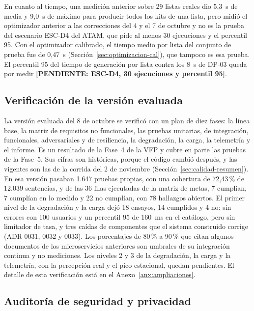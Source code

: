 En cuanto al tiempo, una medición anterior sobre 29 listas reales dio 5,3~s de media y 9,0~s de
máximo para producir todos los kits de una lista, pero midió el optimizador anterior a las
correcciones del 4 y el 7 de octubre y no es la prueba del escenario ESC-D4 del ATAM, que pide al
menos 30 ejecuciones y el percentil 95. Con el optimizador calibrado, el tiempo medio por lista del
conjunto de prueba fue de 0,47~s (Sección~\ref{sec:optimizacion-cal}), que tampoco es esa prueba.
El percentil 95 del tiempo de generación por lista contra los 8~s de DP-03 queda por medir
\textbf{[PENDIENTE: ESC-D4, 30 ejecuciones y percentil 95]}.

\subsection{Verificación de la versión evaluada}
\label{sec:calidad}

La versión evaluada del 8 de octubre se verificó con un plan de diez fases: la línea base, la
matriz de requisitos no funcionales, las pruebas unitarias, de integración, funcionales,
adversariales y de resiliencia, la degradación, la carga, la telemetría y el informe. Es un
resultado de la Fase~4 de la VFP y cubre en parte las pruebas de la Fase~5. Sus cifras son
históricas, porque el código cambió después, y las vigentes son las de la corrida del 2 de
noviembre (Sección~\ref{sec:calidad-resumen}). En esa versión pasaban 1.647 pruebas propias, con
una cobertura de 72,43\,\% de 12.039 sentencias, y de las 36 filas ejecutadas de la matriz de
metas, 7 cumplían, 7 cumplían en lo medido y 22 no cumplían, con 78 hallazgos abiertos. El primer
nivel de la degradación y la carga dejó 18 ensayos, 14 cumplidos y 4 no: sin errores con 100
usuarios y un percentil 95 de 160~ms en el catálogo, pero sin limitador de tasa, y tres caídas de
componentes que el sistema construido corrige (ADR 0031, 0032 y 0033). Los porcentajes de
80\,\% a 90\,\% que citan algunos documentos de los microservicios anteriores son umbrales de su
integración continua y no mediciones. Los niveles 2 y 3 de la degradación, la carga y la
telemetría, con la percepción real y el pico estacional, quedan
pendientes. El detalle de esta
verificación está en el Anexo~\ref{anx:ampliaciones}.

\subsection{Auditoría de seguridad y privacidad}
\label{sec:defectos}

